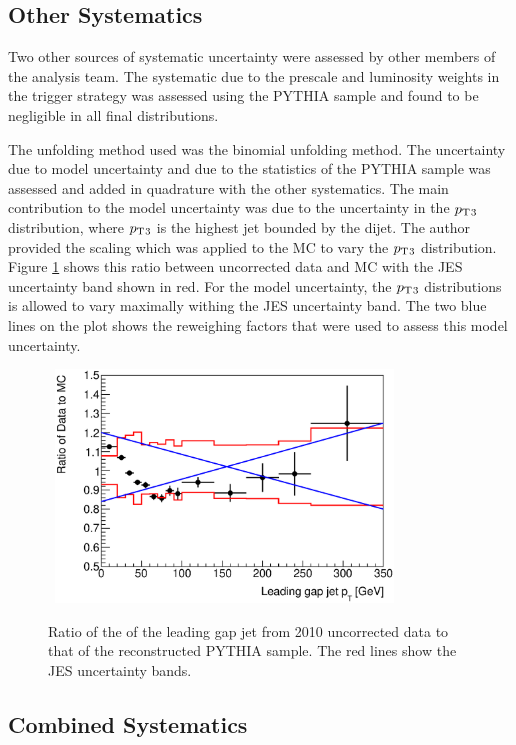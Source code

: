 \subsection {Other Systematics}
Two other sources of systematic uncertainty were assessed  by other members of the analysis team.
The systematic due to the prescale and luminosity weights in the trigger strategy  was assessed using the PYTHIA sample and found to be negligible in all final distributions.

The unfolding method used was the binomial unfolding method.
The uncertainty due to model uncertainty and due to the statistics of the PYTHIA sample was assessed and added in quadrature with the other systematics. 
The main contribution to the model uncertainty was due to the uncertainty in the $\mbox{$p_{\rm T}$}{}_3$ distribution, where $\mbox{$p_{\rm T}$}{}_3$ is the highest \pt{} jet bounded by the dijet. 
The author provided the scaling which was applied to the MC to vary the $\mbox{$p_{\rm T}$}{}_3$ distribution.
Figure \ref{GBJ2:Uncorr:pt3} shows this ratio between uncorrected data and MC with the JES uncertainty band shown in red.
For the model uncertainty, the $\mbox{$p_{\rm T}$}{}_3$ distributions is allowed to vary maximally withing the JES uncertainty band.
The two blue lines on the plot shows the reweighing factors that were used to assess this model uncertainty.
\begin{figure}
\centering
\mbox{
   \includegraphics[width=0.8\textwidth]{figures/GBJ2/ControlPlots/Ratio___pt3.eps}
}
\caption[]{
Ratio of the \pt{} of the leading gap jet from 2010 uncorrected data to that of the reconstructed PYTHIA sample.
The red lines show the JES uncertainty bands.
\label{GBJ2:Uncorr:pt3}}
\end{figure}


\subsection{Combined Systematics}
\label{sec:GBJ2:SysComb}

